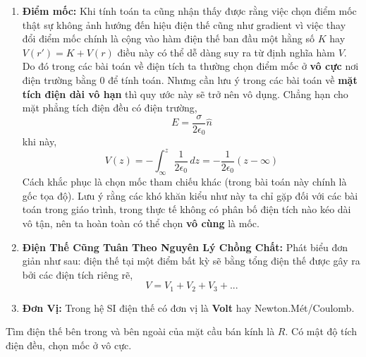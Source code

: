 \begin{enumerate}
\begin{enumerate}
\item \textbf{Điểm mốc:} Khi tính toán ta cũng nhận thấy được rằng việc chọn điểm mốc thật sự không ảnh hướng đến hiệu điện thế cũng như gradient vì việc thay đổi điểm mốc chính là cộng vào hàm điện thế ban đầu một hằng số $K$ hay $V(r') = K + V(r)$ điều này có thể dễ dàng suy ra từ định nghĩa hàm $V$. Do đó trong các bài toán về điện tích ta thường chọn điểm mốc ở \textbf{vô cực} nơi điện trường bằng 0 để tính toán. Nhưng cần lưu ý trong các bài toán về \textbf{mặt tích điện dài vô hạn} thì quy ước này sẽ trở nên vô dụng. Chẳng hạn cho mặt phẳng tích điện đều có điện trường,
\[
 E = \frac{\sigma}{2\epsilon_{0}}\hat{n}
\]
khi này,
\[
V(z) = -\int_{\infty}^{z} \frac{1}{2\epsilon_{0}} \, dz = -\frac{1}{2\epsilon_{0}}(z - \infty)
\]
Cách khắc phục là chọn mốc tham chiếu khác (trong bài toán này chính là gốc tọa độ). Lưu ý rằng các khó khăn kiểu như này ta chỉ gặp đối với các bài toán trong giáo trình, trong thực tế không có phân bố điện tích nào kéo dài vô tận, nên ta hoàn toàn có thể chọn \textbf{vô cùng} là mốc.
\item \textbf{Điện Thế Cũng Tuân Theo Nguyên Lý Chồng Chất:} Phát biểu đơn giản như sau: điện thế tại một điểm bất kỳ sẽ bằng tổng điện thế được gây ra bởi các điện tích riêng rẽ,
\[
V = V_{1} + V_{2} + V_{3} + ...
\]
\item \textbf{Đơn Vị:} Trong hệ SI điện thế có đơn vị là \textbf{Volt} hay Newton.Mét/Coulomb.
\end{enumerate}

\begin{problem}
Tìm điện thế bên trong và bên ngoài của mặt cầu bán kính là $R$. Có mật độ tích điện đều, chọn mốc ở vô cực.
\end{problem}


\end{enumerate}
